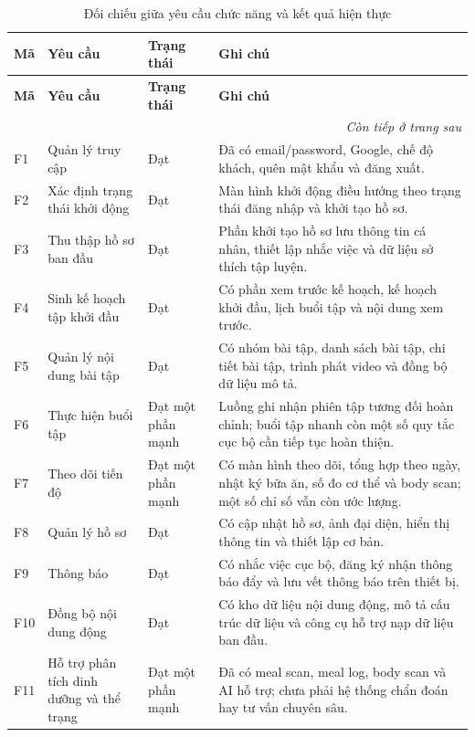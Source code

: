 \small
\begin{longtable}{|p{1.1cm}|p{3.8cm}|p{2.2cm}|p{5.1cm}|}
\caption{Đối chiếu giữa yêu cầu chức năng và kết quả hiện thực}
\label{tab:requirement-mapping}\\
\hline
\textbf{Mã} & \textbf{Yêu cầu} & \textbf{Trạng thái} & \textbf{Ghi chú} \\ \hline
\endfirsthead
\hline
\textbf{Mã} & \textbf{Yêu cầu} & \textbf{Trạng thái} & \textbf{Ghi chú} \\ \hline
\endhead
\hline
\multicolumn{4}{r}{\textit{Còn tiếp ở trang sau}} \\
\endfoot
\hline
\endlastfoot
F1 & Quản lý truy cập & Đạt & Đã có email/password, Google, chế độ khách, quên mật khẩu và đăng xuất. \\ \hline
F2 & Xác định trạng thái khởi động & Đạt & Màn hình khởi động điều hướng theo trạng thái đăng nhập và khởi tạo hồ sơ. \\ \hline
F3 & Thu thập hồ sơ ban đầu & Đạt & Phần khởi tạo hồ sơ lưu thông tin cá nhân, thiết lập nhắc việc và dữ liệu sở thích tập luyện. \\ \hline
F4 & Sinh kế hoạch tập khởi đầu & Đạt & Có phần xem trước kế hoạch, kế hoạch khởi đầu, lịch buổi tập và nội dung xem trước. \\ \hline
F5 & Quản lý nội dung bài tập & Đạt & Có nhóm bài tập, danh sách bài tập, chi tiết bài tập, trình phát video và đồng bộ dữ liệu mô tả. \\ \hline
F6 & Thực hiện buổi tập & Đạt một phần mạnh & Luồng ghi nhận phiên tập tương đối hoàn chỉnh; buổi tập nhanh còn một số quy tắc cục bộ cần tiếp tục hoàn thiện. \\ \hline
F7 & Theo dõi tiến độ & Đạt một phần mạnh & Có màn hình theo dõi, tổng hợp theo ngày, nhật ký bữa ăn, số đo cơ thể và body scan; một số chỉ số vẫn còn ước lượng. \\ \hline
F8 & Quản lý hồ sơ & Đạt & Có cập nhật hồ sơ, ảnh đại diện, hiển thị thông tin và thiết lập cơ bản. \\ \hline
F9 & Thông báo & Đạt & Có nhắc việc cục bộ, đăng ký nhận thông báo đẩy và lưu vết thông báo trên thiết bị. \\ \hline
F10 & Đồng bộ nội dung động & Đạt & Có kho dữ liệu nội dung động, mô tả cấu trúc dữ liệu và công cụ hỗ trợ nạp dữ liệu ban đầu. \\ \hline
F11 & Hỗ trợ phân tích dinh dưỡng và thể trạng & Đạt một phần mạnh & Đã có meal scan, meal log, body scan và AI hỗ trợ; chưa phải hệ thống chẩn đoán hay tư vấn chuyên sâu. \\ \hline
\end{longtable}
\normalsize

